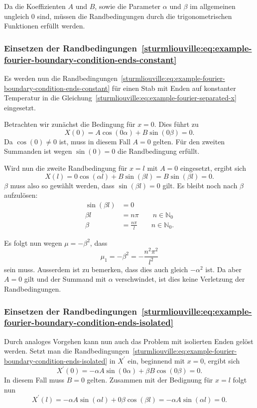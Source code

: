 Da die Koeffizienten $A$ und $B$, sowie die Parameter $\alpha$ und $\beta$ im
allgemeinen ungleich $0$ sind, müssen die Randbedingungen durch die
trigonometrischen Funktionen erfüllt werden.

\subsubsection{Einsetzen der 
Randbedingungen~\eqref{sturmliouville:eq:example-fourier-boundary-condition-ends-constant}}

Es werden nun die 
Randbedingungen~\eqref{sturmliouville:eq:example-fourier-boundary-condition-ends-constant}
für einen Stab mit Enden auf konstanter Temperatur in die
Gleichung~\eqref{sturmliouville:eq:example-fourier-separated-x} eingesetzt.

Betrachten wir zunächst die Bedingung für $x = 0$.
Dies führt zu
\[
    X(0)
    =
    A \cos(0 \alpha) + B \sin(0 \beta)
    =
    0.
\]
Da $\cos(0) \neq 0$ ist, muss in diesem Fall $A = 0$ gelten.
Für den zweiten Summanden ist wegen $\sin(0) = 0$ die Randbedingung erfüllt.

Wird nun die zweite Randbedingung für $x = l$ mit $A = 0$ eingesetzt, ergibt
sich
\[
    X(l)
    =
    0 \cos(\alpha l) + B \sin(\beta l)
    =
    B \sin(\beta l)
    = 0.
\]
$\beta$ muss also so gewählt werden, dass $\sin(\beta l) = 0$ gilt.
Es bleibt noch nach $\beta$ aufzulösen:
\[
\begin{aligned}
    \sin(\beta l) &= 0 \\
    \beta l &= n \pi \qquad n \in \mathbb{N}_0 \\
    \beta &= \frac{n \pi}{l} \qquad n \in \mathbb{N}_0.
\end{aligned}
\]

Es folgt nun wegen $\mu = -\beta^{2}$, dass
\[
    \mu_1 = -\beta^{2} = -\frac{n^{2}\pi^{2}}{l^{2}}
\]
sein muss.
Ausserdem ist zu bemerken, dass dies auch gleich $-\alpha^{2}$ ist.
Da aber $A = 0$ gilt und der Summand mit $\alpha$ verschwindet, ist dies keine
Verletzung der Randbedingungen.

\subsubsection{Einsetzen der 
Randbedingungen~\eqref{sturmliouville:eq:example-fourier-boundary-condition-ends-isolated}}

Durch analoges Vorgehen kann nun auch das Problem mit isolierten Enden gelöst
werden.
Setzt man die 
Randbedingungen~\eqref{sturmliouville:eq:example-fourier-boundary-condition-ends-isolated}
in $X^{\prime}$ ein, beginnend mit $x = 0$, ergibt sich
\[
    X^{\prime}(0)
    =
    -\alpha A \sin(0 \alpha) + \beta B \cos(0 \beta)
    = 0.
\]
In diesem Fall muss $B = 0$ gelten.
Zusammen mit der Bedignung für $x = l$
folgt nun
\[
    X^{\prime}(l)
    =
    - \alpha A \sin(\alpha l) + 0 \beta \cos(\beta l)
    =
    - \alpha A \sin(\alpha l)
    = 0.
\]

